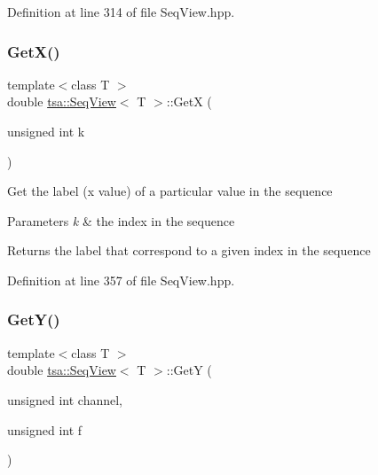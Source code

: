 Definition at line 314 of file Seq\+View.\+hpp.

\mbox{\label{classtsa_1_1_seq_view_a43c18f56f11a2557fa44fbd28acec28c}} 
\subsubsection{\texorpdfstring{Get\+X()}{GetX()}}
{\footnotesize\ttfamily template$<$class T $>$ \\
double \hyperlink{classtsa_1_1_seq_view}{tsa\+::\+Seq\+View}$<$ T $>$\+::GetX (\begin{DoxyParamCaption}\item[{unsigned int}]{k }\end{DoxyParamCaption})\hspace{0.3cm}{\ttfamily [inline]}}

Get the label (x value) of a particular value in the sequence


\begin{DoxyParams}{Parameters}
{\em k} & the index in the sequence\\
\hline
\end{DoxyParams}
\begin{DoxyReturn}{Returns}
the label that correspond to a given index in the sequence 
\end{DoxyReturn}


Definition at line 357 of file Seq\+View.\+hpp.

\mbox{\label{classtsa_1_1_seq_view_a768d8f8a3ab1db372a382ca4345dd426}} 
\subsubsection{\texorpdfstring{Get\+Y()}{GetY()}}
{\footnotesize\ttfamily template$<$class T $>$ \\
double \hyperlink{classtsa_1_1_seq_view}{tsa\+::\+Seq\+View}$<$ T $>$\+::GetY (\begin{DoxyParamCaption}\item[{unsigned int}]{channel,  }\item[{unsigned int}]{f }\end{DoxyParamCaption})\hspace{0.3cm}{\ttfamily [inline]}}



